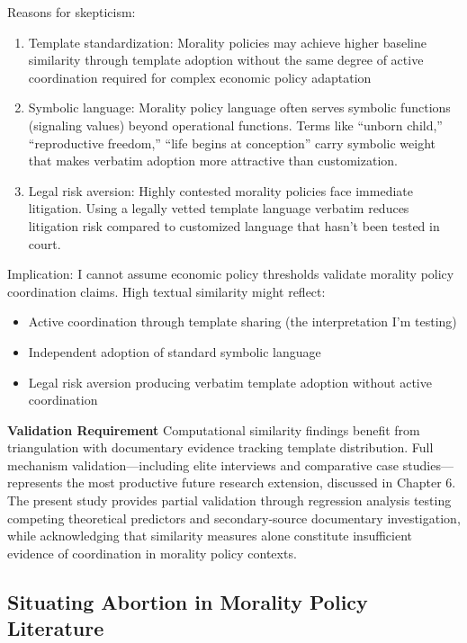 Reasons for skepticism:

\begin{enumerate}
\item Template standardization: Morality policies may achieve higher baseline similarity through template adoption without the same degree of active coordination required for complex economic policy adaptation

\item Symbolic language: Morality policy language often serves symbolic functions (signaling values) beyond operational functions. Terms like ``unborn child,'' ``reproductive freedom,'' ``life begins at conception'' carry symbolic weight that makes verbatim adoption more attractive than customization.

\item Legal risk aversion: Highly contested morality policies face immediate litigation. Using a legally vetted template language verbatim reduces litigation risk compared to customized language that hasn't been tested in court.
\end{enumerate}

Implication: I cannot assume economic policy thresholds validate morality policy coordination claims. High textual similarity might reflect:
\begin{itemize}
\item Active coordination through template sharing (the interpretation I'm testing)
\item Independent adoption of standard symbolic language
\item Legal risk aversion producing verbatim template adoption without active coordination
\end{itemize}

\textbf{Validation Requirement} Computational similarity findings benefit from triangulation with documentary evidence tracking template distribution. Full mechanism validation---including elite interviews and comparative case studies---represents the most productive future research extension, discussed in Chapter 6. The present study provides partial validation through regression analysis testing competing theoretical predictors and secondary-source documentary investigation, while acknowledging that similarity measures alone constitute insufficient evidence of coordination in morality policy contexts.

\subsection{Situating Abortion in Morality Policy Literature}

